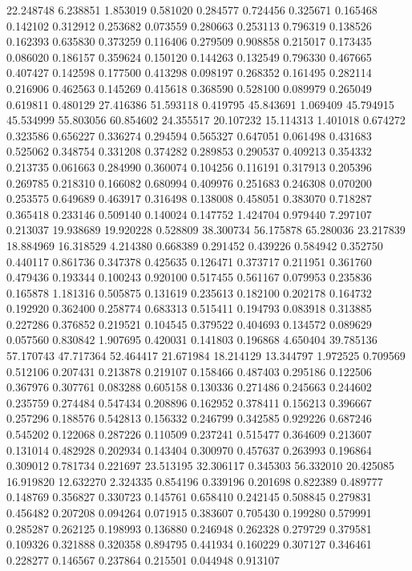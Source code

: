 22.248748
6.238851
1.853019
0.581020
0.284577
0.724456
0.325671
0.165468
0.142102
0.312912
0.253682
0.073559
0.280663
0.253113
0.796319
0.138526
0.162393
0.635830
0.373259
0.116406
0.279509
0.908858
0.215017
0.173435
0.086020
0.186157
0.359624
0.150120
0.144263
0.132549
0.796330
0.467665
0.407427
0.142598
0.177500
0.413298
0.098197
0.268352
0.161495
0.282114
0.216906
0.462563
0.145269
0.415618
0.368590
0.528100
0.089979
0.265049
0.619811
0.480129
27.416386
51.593118
0.419795
45.843691
1.069409
45.794915
45.534999
55.803056
60.854602
24.355517
20.107232
15.114313
1.401018
0.674272
0.323586
0.656227
0.336274
0.294594
0.565327
0.647051
0.061498
0.431683
0.525062
0.348754
0.331208
0.374282
0.289853
0.290537
0.409213
0.354332
0.213735
0.061663
0.284990
0.360074
0.104256
0.116191
0.317913
0.205396
0.269785
0.218310
0.166082
0.680994
0.409976
0.251683
0.246308
0.070200
0.253575
0.649689
0.463917
0.316498
0.138008
0.458051
0.383070
0.718287
0.365418
0.233146
0.509140
0.140024
0.147752
1.424704
0.979440
7.297107
0.213037
19.938689
19.920228
0.528809
38.300734
56.175878
65.280036
23.217839
18.884969
16.318529
4.214380
0.668389
0.291452
0.439226
0.584942
0.352750
0.440117
0.861736
0.347378
0.425635
0.126471
0.373717
0.211951
0.361760
0.479436
0.193344
0.100243
0.920100
0.517455
0.561167
0.079953
0.235836
0.165878
1.181316
0.505875
0.131619
0.235613
0.182100
0.202178
0.164732
0.192920
0.362400
0.258774
0.683313
0.515411
0.194793
0.083918
0.313885
0.227286
0.376852
0.219521
0.104545
0.379522
0.404693
0.134572
0.089629
0.057560
0.830842
1.907695
0.420031
0.141803
0.196868
4.650404
39.785136
57.170743
47.717364
52.464417
21.671984
18.214129
13.344797
1.972525
0.709569
0.512106
0.207431
0.213878
0.219107
0.158466
0.487403
0.295186
0.122506
0.367976
0.307761
0.083288
0.605158
0.130336
0.271486
0.245663
0.244602
0.235759
0.274484
0.547434
0.208896
0.162952
0.378411
0.156213
0.396667
0.257296
0.188576
0.542813
0.156332
0.246799
0.342585
0.929226
0.687246
0.545202
0.122068
0.287226
0.110509
0.237241
0.515477
0.364609
0.213607
0.131014
0.482928
0.202934
0.143404
0.300970
0.457637
0.263993
0.196864
0.309012
0.781734
0.221697
23.513195
32.306117
0.345303
56.332010
20.425085
16.919820
12.632270
2.324335
0.854196
0.339196
0.201698
0.822389
0.489777
0.148769
0.356827
0.330723
0.145761
0.658410
0.242145
0.508845
0.279831
0.456482
0.207208
0.094264
0.071915
0.383607
0.705430
0.199280
0.579991
0.285287
0.262125
0.198993
0.136880
0.246948
0.262328
0.279729
0.379581
0.109326
0.321888
0.320358
0.894795
0.441934
0.160229
0.307127
0.346461
0.228277
0.146567
0.237864
0.215501
0.044948
0.913107
